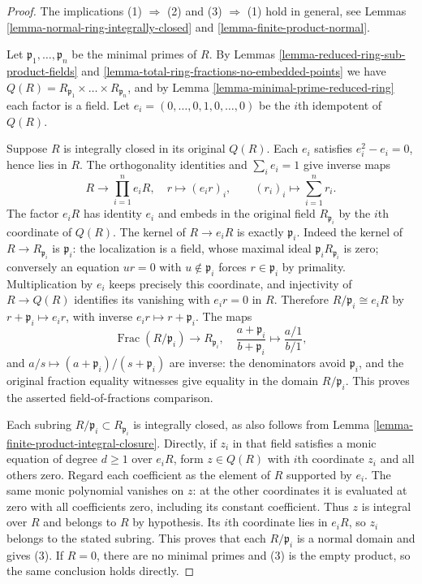 \begin{proof}
The implications (1) $\Rightarrow$ (2) and
(3) $\Rightarrow$ (1) hold in general,
see Lemmas \ref{lemma-normal-ring-integrally-closed} and
\ref{lemma-finite-product-normal}.

\medskip\noindent
Let $\mathfrak p_1, \ldots, \mathfrak p_n$ be the minimal primes of $R$.
By Lemmas \ref{lemma-reduced-ring-sub-product-fields} and
\ref{lemma-total-ring-fractions-no-embedded-points} we have
$Q(R) = R_{\mathfrak p_1} \times \ldots \times R_{\mathfrak p_n}$, and
by Lemma \ref{lemma-minimal-prime-reduced-ring} each factor is a field.
Let $e_i = (0, \ldots, 0, 1, 0, \ldots, 0)$ be the $i$th idempotent
of $Q(R)$.

\medskip\noindent
Suppose $R$ is integrally closed in its original $Q(R)$.
Each $e_i$ satisfies $e_i^2-e_i=0$, hence lies in $R$.
The orthogonality identities and $\sum_i e_i=1$ give inverse maps
$$
R\longrightarrow\prod_{i=1}^n e_iR,\quad
r\longmapsto(e_ir)_i,
\qquad (r_i)_i\longmapsto\sum_{i=1}^n r_i.
$$
The factor $e_iR$ has identity $e_i$ and embeds in the original
field $R_{\mathfrak p_i}$ by the $i$th coordinate of $Q(R)$.
The kernel of $R\to e_iR$ is exactly $\mathfrak p_i$.
Indeed the kernel of $R\to R_{\mathfrak p_i}$ is
$\mathfrak p_i$: the localization is a field, whose maximal ideal
$\mathfrak p_iR_{\mathfrak p_i}$ is zero; conversely an equation
$ur=0$ with $u\notin\mathfrak p_i$ forces $r\in\mathfrak p_i$
by primality. Multiplication by $e_i$ keeps precisely this
coordinate, and injectivity of $R\to Q(R)$ identifies its
vanishing with $e_ir=0$ in $R$. Therefore
$R/\mathfrak p_i\cong e_iR$ by $r+\mathfrak p_i\mapsto e_ir$,
with inverse $e_ir\mapsto r+\mathfrak p_i$.
The maps
$$
\operatorname{Frac}(R/\mathfrak p_i)\longrightarrow R_{\mathfrak p_i},
\quad\frac{a+\mathfrak p_i}{b+\mathfrak p_i}
\longmapsto\frac{a/1}{b/1},
$$
and $a/s\mapsto(a+\mathfrak p_i)/(s+\mathfrak p_i)$ are inverse:
the denominators avoid $\mathfrak p_i$, and the original fraction
equality witnesses give equality in the domain $R/\mathfrak p_i$.
This proves the asserted field-of-fractions comparison.

Each subring $R/\mathfrak p_i\subset R_{\mathfrak p_i}$ is
integrally closed, as also follows from
Lemma \ref{lemma-finite-product-integral-closure}.
Directly, if $z_i$ in that field satisfies a monic equation of
degree $d\geq1$ over $e_iR$, form $z\in Q(R)$ with $i$th
coordinate $z_i$ and all others zero. Regard each coefficient
as the element of $R$ supported by $e_i$. The same monic
polynomial vanishes on $z$: at the other coordinates it is
evaluated at zero with all coefficients zero, including its
constant coefficient. Thus $z$ is integral over $R$ and belongs
to $R$ by hypothesis. Its $i$th coordinate lies in $e_iR$,
so $z_i$ belongs to the stated subring. This proves that each
$R/\mathfrak p_i$ is a normal domain and gives (3).
If $R=0$, there are no minimal primes and (3) is the empty
product, so the same conclusion holds directly.
\end{proof}

